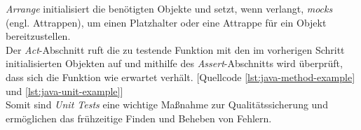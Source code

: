\textit{Arrange} initialisiert die benötigten Objekte und setzt, wenn verlangt, \textit{mocks} (engl. Attrappen), um einen Platzhalter oder eine Attrappe für ein Objekt bereitzustellen.\\ Der \textit{Act}-Abschnitt ruft die zu testende Funktion mit den im vorherigen Schritt initialisierten Objekten auf und mithilfe des \textit{Assert}-Abschnitts wird überprüft, dass sich die Funktion wie erwartet verhält. \cite*{ikechiHowStructureUnit2021} [Quellcode \ref{lst:java-method-example} und \ref{lst:java-unit-example}]\\
\vspace{-.3cm}
Somit sind \textit{Unit Tests} eine wichtige Maßnahme zur Qualitätssicherung und ermöglichen das frühzeitige Finden und Beheben von Fehlern.\\
\vspace{-.3cm}


